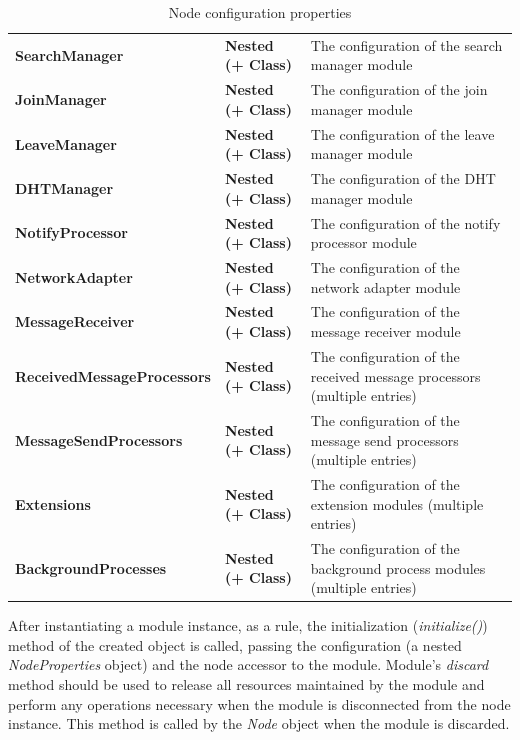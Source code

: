 \begin{table}
\begin{center}
\begin{tabular}{p{3.5cm} p{2.5cm} p{8.5cm}}
	\textbf{SearchManager}				& \textbf{Nested (+ Class)}		& The configuration of the search manager module										\\[1.5mm]
	\textbf{JoinManager}				& \textbf{Nested (+ Class)}		& The configuration of the join manager module											\\[1.5mm]
	\textbf{LeaveManager}				& \textbf{Nested (+ Class)}		& The configuration of the leave manager module											\\[1.5mm]
	\textbf{DHTManager}					& \textbf{Nested (+ Class)}		& The configuration of the DHT manager module											\\[1.5mm]
	\textbf{NotifyProcessor}			& \textbf{Nested (+ Class)}		& The configuration of the notify processor module										\\[1.5mm]
	\textbf{NetworkAdapter}				& \textbf{Nested (+ Class)}		& The configuration of the network adapter module										\\[1.5mm]
	\textbf{MessageReceiver}			& \textbf{Nested (+ Class)}		& The configuration of the message receiver module										\\[1.5mm]
	\textbf{ReceivedMessageProcessors}	& \textbf{Nested (+ Class)}		& The configuration of the received message processors (multiple entries)				\\[1.5mm]
	\textbf{MessageSendProcessors}		& \textbf{Nested (+ Class)}		& The configuration of the message send processors (multiple entries)					\\[1.5mm]
	\textbf{Extensions}					& \textbf{Nested (+ Class)}		& The configuration of the extension modules (multiple entries)							\\[1.5mm]
	\textbf{BackgroundProcesses}		& \textbf{Nested (+ Class)}		& The configuration of the background process modules (multiple entries)				\\[1.5mm]
    \hline
\end{tabular}
\end{center}
\caption{Node configuration properties}
\label{tab:libPropNode}
\end{table}


After instantiating a module instance, as a rule, the initialization (\emph{initialize()}) method of the created object is called, passing the configuration (a nested \emph{NodeProperties} object) and the node accessor to the module. Module's \emph{discard} method should be used to release all resources maintained by the module and perform any operations necessary when the module is disconnected from the node instance. This method is called by the \emph{Node} object when the module is discarded.

